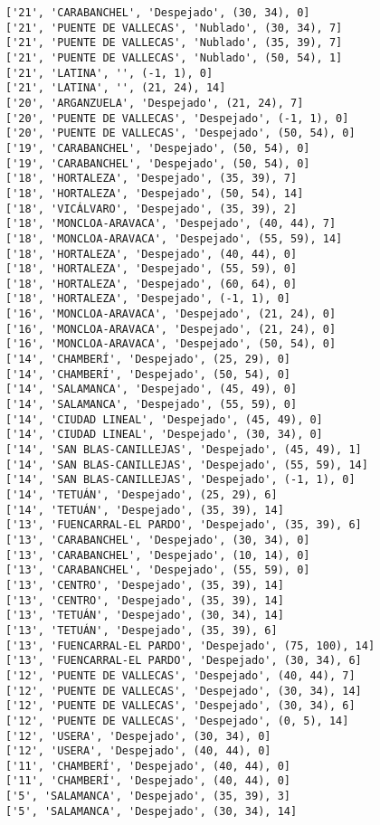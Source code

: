 \documentclass[11pt]{article}
\begin{document}
\begin{Verbatim}[commandchars=\\\{\}]
['21', 'CARABANCHEL', 'Despejado', (30, 34), 0]
['21', 'PUENTE DE VALLECAS', 'Nublado', (30, 34), 7]
['21', 'PUENTE DE VALLECAS', 'Nublado', (35, 39), 7]
['21', 'PUENTE DE VALLECAS', 'Nublado', (50, 54), 1]
['21', 'LATINA', '', (-1, 1), 0]
['21', 'LATINA', '', (21, 24), 14]
['20', 'ARGANZUELA', 'Despejado', (21, 24), 7]
['20', 'PUENTE DE VALLECAS', 'Despejado', (-1, 1), 0]
['20', 'PUENTE DE VALLECAS', 'Despejado', (50, 54), 0]
['19', 'CARABANCHEL', 'Despejado', (50, 54), 0]
['19', 'CARABANCHEL', 'Despejado', (50, 54), 0]
['18', 'HORTALEZA', 'Despejado', (35, 39), 7]
['18', 'HORTALEZA', 'Despejado', (50, 54), 14]
['18', 'VICÁLVARO', 'Despejado', (35, 39), 2]
['18', 'MONCLOA-ARAVACA', 'Despejado', (40, 44), 7]
['18', 'MONCLOA-ARAVACA', 'Despejado', (55, 59), 14]
['18', 'HORTALEZA', 'Despejado', (40, 44), 0]
['18', 'HORTALEZA', 'Despejado', (55, 59), 0]
['18', 'HORTALEZA', 'Despejado', (60, 64), 0]
['18', 'HORTALEZA', 'Despejado', (-1, 1), 0]
['16', 'MONCLOA-ARAVACA', 'Despejado', (21, 24), 0]
['16', 'MONCLOA-ARAVACA', 'Despejado', (21, 24), 0]
['16', 'MONCLOA-ARAVACA', 'Despejado', (50, 54), 0]
['14', 'CHAMBERÍ', 'Despejado', (25, 29), 0]
['14', 'CHAMBERÍ', 'Despejado', (50, 54), 0]
['14', 'SALAMANCA', 'Despejado', (45, 49), 0]
['14', 'SALAMANCA', 'Despejado', (55, 59), 0]
['14', 'CIUDAD LINEAL', 'Despejado', (45, 49), 0]
['14', 'CIUDAD LINEAL', 'Despejado', (30, 34), 0]
['14', 'SAN BLAS-CANILLEJAS', 'Despejado', (45, 49), 1]
['14', 'SAN BLAS-CANILLEJAS', 'Despejado', (55, 59), 14]
['14', 'SAN BLAS-CANILLEJAS', 'Despejado', (-1, 1), 0]
['14', 'TETUÁN', 'Despejado', (25, 29), 6]
['14', 'TETUÁN', 'Despejado', (35, 39), 14]
['13', 'FUENCARRAL-EL PARDO', 'Despejado', (35, 39), 6]
['13', 'CARABANCHEL', 'Despejado', (30, 34), 0]
['13', 'CARABANCHEL', 'Despejado', (10, 14), 0]
['13', 'CARABANCHEL', 'Despejado', (55, 59), 0]
['13', 'CENTRO', 'Despejado', (35, 39), 14]
['13', 'CENTRO', 'Despejado', (35, 39), 14]
['13', 'TETUÁN', 'Despejado', (30, 34), 14]
['13', 'TETUÁN', 'Despejado', (35, 39), 6]
['13', 'FUENCARRAL-EL PARDO', 'Despejado', (75, 100), 14]
['13', 'FUENCARRAL-EL PARDO', 'Despejado', (30, 34), 6]
['12', 'PUENTE DE VALLECAS', 'Despejado', (40, 44), 7]
['12', 'PUENTE DE VALLECAS', 'Despejado', (30, 34), 14]
['12', 'PUENTE DE VALLECAS', 'Despejado', (30, 34), 6]
['12', 'PUENTE DE VALLECAS', 'Despejado', (0, 5), 14]
['12', 'USERA', 'Despejado', (30, 34), 0]
['12', 'USERA', 'Despejado', (40, 44), 0]
['11', 'CHAMBERÍ', 'Despejado', (40, 44), 0]
['11', 'CHAMBERÍ', 'Despejado', (40, 44), 0]
['5', 'SALAMANCA', 'Despejado', (35, 39), 3]
['5', 'SALAMANCA', 'Despejado', (30, 34), 14]

\end{Verbatim}
\end{document}
